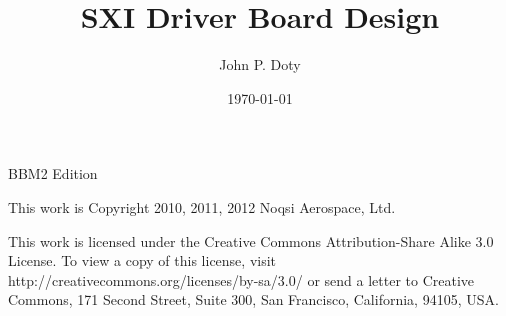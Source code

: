 \usepackage{ucs}
\usepackage[utf8x]{inputenc}
\usepackage[english]{babel}
\usepackage{fontenc}
\usepackage{graphicx}
\usepackage{grffile}
\usepackage[hmargin=2cm,vmargin=2.5cm]{geometry}
\usepackage{tikz-timing}

\setlength{\parindent}{0.0in}
\setlength{\parskip}{0.1in}

\newcommand{\tsvtable}[1]{
\begin{table}[h]
\centering
\texttt{[image: \#1.tsv.pdf]}
\caption{#1}
\label{#1}
\end{table}
}

\usepackage{placeins}
\let\oldsection\section
\renewcommand{\section}{\FloatBarrier\oldsection} 

\pagestyle{headings}

\usepackage[pdftex]{hyperref}

\author{John P. Doty}
\date{\today}
\title{SXI Driver Board Design}


\begin{titlepage}
\maketitle
\begin{center}
BBM2 Edition
\end{center}
\vspace{5cm}

This work is Copyright 2010, 2011, 2012 Noqsi Aerospace, Ltd.

This work is licensed under the Creative Commons Attribution-Share Alike 3.0 License. To view a copy of this license, visit http://creativecommons.org/licenses/by-sa/3.0/ or send a letter to Creative Commons, 171 Second Street, Suite 300, San Francisco, California, 94105, USA.

\end{titlepage} 


